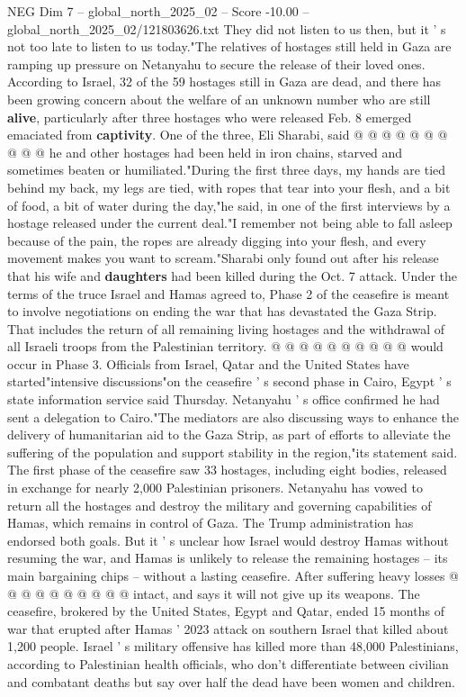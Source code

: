 \begin{textsample}{NEG Dim 7 – global\_north\_2025\_02 – Score -10.00 – global\_north\_2025\_02/121803626.txt}
They did not listen to us then, but it ' s not too late to listen to us today."The relatives of hostages still held in Gaza are ramping up pressure on Netanyahu to secure the release of their loved ones.
According to Israel, 32 of the 59 hostages still in Gaza are dead, and there has been growing concern about the welfare of an unknown number who are still \textbf{alive}, particularly after three hostages who were released Feb. 8 emerged emaciated from \textbf{captivity}.
One of the three, Eli Sharabi, said @ @ @ @ @ @ @ @ @ @ he and other hostages had been held in iron chains, starved and sometimes beaten or humiliated."During the first three days, my hands are tied behind my back, my legs are tied, with ropes that tear into your flesh, and a bit of food, a bit of water during the day,"he said, in one of the first interviews by a hostage released under the current deal."I remember not being able to fall asleep because of the pain, the ropes are already digging into your flesh, and every movement makes you want to scream."Sharabi only found out after his release that his wife and \textbf{daughters} had been killed during the Oct. 7 attack.
Under the terms of the truce Israel and Hamas agreed to, Phase 2 of the ceasefire is meant to involve negotiations on ending the war that has devastated the Gaza Strip.
That includes the return of all remaining living hostages and the withdrawal of all Israeli troops from the Palestinian territory. @ @ @ @ @ @ @ @ @ @ would occur in Phase 3.
Officials from Israel, Qatar and the United States have started"intensive discussions"on the ceasefire ' s second phase in Cairo, Egypt ' s state information service said Thursday.
Netanyahu ' s office confirmed he had sent a delegation to Cairo."The mediators are also discussing ways to enhance the delivery of humanitarian aid to the Gaza Strip, as part of efforts to alleviate the suffering of the population and support stability in the region,"its statement said.
The first phase of the ceasefire saw 33 hostages, including eight bodies, released in exchange for nearly 2,000 Palestinian prisoners.
Netanyahu has vowed to return all the hostages and destroy the military and governing capabilities of Hamas, which remains in control of Gaza.
The Trump administration has endorsed both goals.
But it ' s unclear how Israel would destroy Hamas without resuming the war, and Hamas is unlikely to release the remaining hostages -- its main bargaining chips -- without a lasting ceasefire.
After suffering heavy losses @ @ @ @ @ @ @ @ @ @ intact, and says it will not give up its weapons.
The ceasefire, brokered by the United States, Egypt and Qatar, ended 15 months of war that erupted after Hamas ' 2023 attack on southern Israel that killed about 1,200 people.
Israel ' s military offensive has killed more than 48,000 Palestinians, according to Palestinian health officials, who don't differentiate between civilian and combatant deaths but say over half the dead have been women and children.

\end{textsample}
